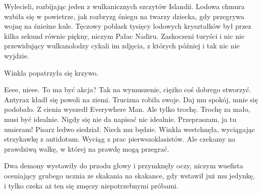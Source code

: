 Wylecieli, rozbijając jeden z wulkanicznych szczytów Islandii.
Lodowa chmura wzbiła się w powietrze, jak rozbryzg śniegu na twarzy dziecka, gdy przegrywa wojnę na śnieżne kule.
Tęczowy poblask tysięcy lodowych kryształków był przez kilka sekund równie piękny, niczym Pałac Nadiru.
Zaskoczeni turyści i nic nie przewidujący wulkanolodzy cykali im zdjęcia, z których później i tak nic nie wyjdzie.

\divider{}

Winkla popatrzyła się krzywo.
\begin{dialogue}
\ds{} Eeee, nieee. To ma być akcja? 
\ds{} Tak na wymuszenie, ciężko coś dobrego stworzyć. \dm{} Antyrax kładł się powoli na ziemi. Trucizna robiła swoje.
\ds{} Daj mu spokój, mnie się podobało. \dm{} Z cienia wyszedł Everywhere Man. \dm{} Ale tylko trochę.
\ds{} Trochę za mało, musi być idealnie.
\ds{} Nigdy się nie da napisać nic idealnie.
\ds{} Przepraszam, ja tu umieram! \dm{} Pisarz ledwo siedział.
\ds{} Niech mu będzie. \dm{} Winkla westchnęła, wyciągając strzykawkę z antidotum. Wyciąg z prac pierwszoklasistów. \dm{} Ale czekamy na prawdziwą walkę, w której na prawdę mogą przegrać.
\end{dialogue}
Dwa demony wystawiły do przodu głowy i przymknęły oczy, niczym wuefista oceniający grubego ucznia ze skakania na skakance, gdy wstawił już mu jedynkę, i tylko czeka aż ten się zmęczy niepotrzebnymi próbami.

\divider{}

